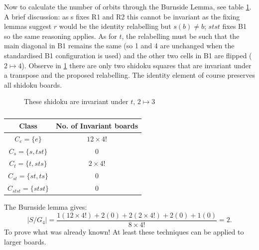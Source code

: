 \documentclass[a4paper,11pt]{report}
\newcounter{row}
\newcounter{col}
\newcounter{rowa}
\newcounter{cola}
\newcommand\setrowa[4]{
\setcounter{cola}{1}
\foreach \n in {#1, #2, #3, #4} {
\edef\x{\value{cola} - 0.5}
\edef\y{4.5 - \value{rowa}}
\node[anchor=center] at (\x, \y) {\n};
\stepcounter{cola}
}
\stepcounter{rowa}
}
\begin{document}
Now to calculate the number of orbits through the Burnside Lemma, see table \ref{table:burnside}. A brief discussion: as s fixes R1 and R2 this cannot be invariant as the fixing lemmas suggest $r$ would be the identity relabelling but $s(b)\neq b$; $stst$ fixes B1 so the same reasoning applies. As for $t$, the relabelling must be such that the main diagonal in B1 remains the same (so 1 and 4 are unchanged when the standardised B1 configuration is used) and the other two cells in B1 are flipped ($2\mapsto 4$). Observe in \ref{fig:transpose} there are only two shidoku squares that are invariant under a transpose and the proposed relabelling. The identity element of course preserves all shidoku boards.

\begin{figure}[h]
\centering
{}
\caption{These shidoku are invariant under $t$, $2\mapsto 3$}
\label{fig:transpose}
\end{figure}

\begin{table}[!h]
\begin{center}
\begin{tabular}{ |c|c| }
\hline
Class & No. of Invariant boards\\
\hline
$C_e=\{e\}$&$12\times 4!$\\
$C_s = \{s,tst\}$&0\\
$C_t = \{t,sts\}$&$2\times4!$\\
$C_{st}=\{st,ts\}$&0\\
$C_{stst}=\{stst\}$&0\\
\hline
\end{tabular}
\end{center}
\caption{\label{table:burnside}}
\end{table}

The Burnside lemma gives:
\begin{equation}|S/G_4|=\frac{1(12\times 4!)+ 2(0)+2(2\times 4!)+2(0)+1(0)}{8\times 4!}=2.\end{equation}
To prove what was already known! At least these techniques can be applied to larger boards.
\end{document}
